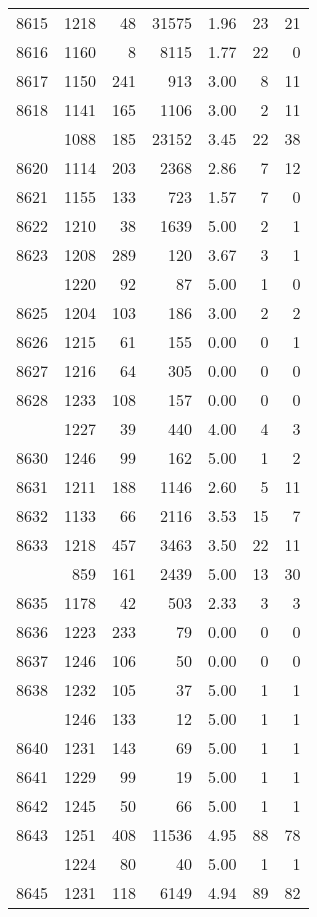 \documentclass[
]{article}
\begin{document}
\begin{table}
\begin{tabular}[t]{lrrrrrr}
8615 & 1218 & 48 & 31575 & 1.96 & 23 & 21\\
8616 & 1160 & 8 & 8115 & 1.77 & 22 & 0\\
8617 & 1150 & 241 & 913 & 3.00 & 8 & 11\\
8618 & 1141 & 165 & 1106 & 3.00 & 2 & 11\\
\addlinespace
8619 & 1088 & 185 & 23152 & 3.45 & 22 & 38\\
8620 & 1114 & 203 & 2368 & 2.86 & 7 & 12\\
8621 & 1155 & 133 & 723 & 1.57 & 7 & 0\\
8622 & 1210 & 38 & 1639 & 5.00 & 2 & 1\\
8623 & 1208 & 289 & 120 & 3.67 & 3 & 1\\
\addlinespace
8624 & 1220 & 92 & 87 & 5.00 & 1 & 0\\
8625 & 1204 & 103 & 186 & 3.00 & 2 & 2\\
8626 & 1215 & 61 & 155 & 0.00 & 0 & 1\\
8627 & 1216 & 64 & 305 & 0.00 & 0 & 0\\
8628 & 1233 & 108 & 157 & 0.00 & 0 & 0\\
\addlinespace
8629 & 1227 & 39 & 440 & 4.00 & 4 & 3\\
8630 & 1246 & 99 & 162 & 5.00 & 1 & 2\\
8631 & 1211 & 188 & 1146 & 2.60 & 5 & 11\\
8632 & 1133 & 66 & 2116 & 3.53 & 15 & 7\\
8633 & 1218 & 457 & 3463 & 3.50 & 22 & 11\\
\addlinespace
8634 & 859 & 161 & 2439 & 5.00 & 13 & 30\\
8635 & 1178 & 42 & 503 & 2.33 & 3 & 3\\
8636 & 1223 & 233 & 79 & 0.00 & 0 & 0\\
8637 & 1246 & 106 & 50 & 0.00 & 0 & 0\\
8638 & 1232 & 105 & 37 & 5.00 & 1 & 1\\
\addlinespace
8639 & 1246 & 133 & 12 & 5.00 & 1 & 1\\
8640 & 1231 & 143 & 69 & 5.00 & 1 & 1\\
8641 & 1229 & 99 & 19 & 5.00 & 1 & 1\\
8642 & 1245 & 50 & 66 & 5.00 & 1 & 1\\
8643 & 1251 & 408 & 11536 & 4.95 & 88 & 78\\
\addlinespace
8644 & 1224 & 80 & 40 & 5.00 & 1 & 1\\
8645 & 1231 & 118 & 6149 & 4.94 & 89 & 82\\

\end{tabular}
\end{table}
\end{document}
